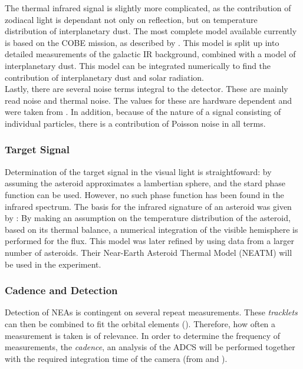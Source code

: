 \documentclass[12pt, english, NoHyper]{AE4010-template}
\begin{document}
The thermal infrared signal is slightly more complicated, as the contribution of zodiacal light is dependant not only on reflection, but on temperature distribution of interplanetary dust. The most complete model available currently is based on the COBE mission, as described by \cite{COBEIRBackground}. This model is split up into detailed measurements of the galactic IR background, combined with a model of interplanetary dust. This model can be integrated numerically to find the contribution of interplanetary dust and solar radiation. \\

Lastly, there are several noise terms integral to the detector. These are mainly read noise and thermal noise. The values for these are hardware dependent and were taken from \cite{NEOSDT2}. In addition, because of the nature of a signal consisting of individual particles, there is a contribution of Poisson noise in all terms.

\subsubsection{Target Signal}
Determination of the target signal in the visual light is straightfoward: by assuming the asteroid approximates a lambertian sphere, and the stard phase function can be used. However, no such phase function has been found in the infrared spectrum. The basis for the infrared signature of an asteroid was given by \cite{AsteroidSTM}: By making an assumption on the temperature distribution of the asteroid, based on its thermal balance, a numerical integration of the visible hemisphere is performed for the flux. This model was later refined by \cite{AsteroidsInTIR} using data from a larger number of asteroids. Their Near-Earth Asteroid Thermal Model (NEATM) will be used in the experiment.

\subsubsection{Cadence and Detection}
Detection of NEAs is contingent on several repeat measurements. These \textit{tracklets} can then be combined to fit the orbital elements (\cite{OpNav}). Therefore, how often a measurement is taken is of relevance. In order to determine the frequency of measurements, the \textit{cadence}, an analysis of the ADCS will be performed together with the required integration time of the camera (from \cite{NEOSDT2} and \cite{ThesisOlga}). \\
\end{document}
